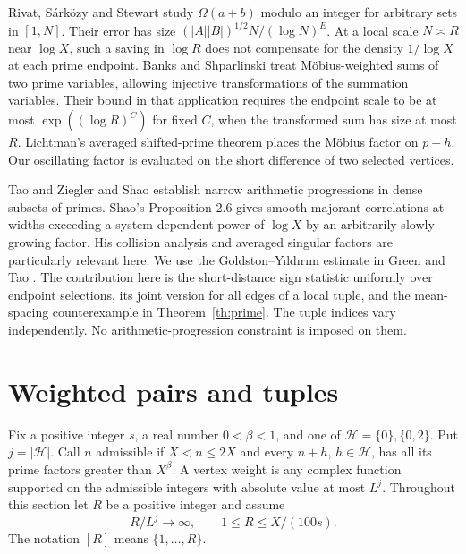 \documentclass[11pt]{article}
\begin{document}
Rivat, S\'ark\"ozy and Stewart \cite[Theorem 1]{rss} study \(\Omega(a+b)\)
modulo an integer for arbitrary sets in \([1,N]\). Their error has size
\((|A||B|)^{1/2}N/(\log N)^E\). At a local scale \(N\asymp R\) near
\(\log X\), such a saving in \(\log R\) does not compensate for the density
\(1/\log X\) at each prime endpoint. Banks and Shparlinski
\cite[\S7.1]{banks} treat M\"obius-weighted sums of two prime variables,
allowing injective transformations of the summation variables. Their bound
in that application requires the endpoint scale to be at most
\(\exp((\log R)^C)\) for fixed \(C\), when the transformed sum has size at
most \(R\). Lichtman's averaged shifted-prime theorem
\cite[Theorem 1.1]{lichtman} places the M\"obius factor on \(p+h\).
Our oscillating factor is evaluated on the short difference of two selected
vertices.

Tao and Ziegler \cite{tz} and Shao \cite{shao} establish narrow arithmetic
progressions in dense subsets of primes. Shao's Proposition 2.6 gives smooth
majorant correlations at widths exceeding a system-dependent power of \(\log X\)
by an arbitrarily slowly growing factor. His collision analysis and averaged
singular factors are particularly relevant here. We use the Goldston--Y{\i}ld{\i}r{\i}m
estimate in Green and Tao \cite[Appendix D, Theorem D.3]{gt}. The contribution
here is the short-distance sign statistic uniformly over endpoint selections,
its joint version for all edges of a local tuple, and the mean-spacing
counterexample in Theorem~\ref{th:prime}. The tuple indices vary independently.
No arithmetic-progression constraint is imposed on them.

\section{Weighted pairs and tuples}
Fix a positive integer \(s\), a real number \(0<\beta<1\), and one of
\(\mathcal H=\{0\},\{0,2\}\). Put \(j=|\mathcal H|\). Call \(n\) admissible
if \(X<n\le2X\) and every \(n+h\), \(h\in\mathcal H\), has all its prime
factors greater than \(X^\beta\). A vertex weight is any complex function
supported on the admissible integers with absolute value at most \(L^j\).
Throughout this section let \(R\) be a positive integer and assume
\begin{equation}\label{eq:width}
       R/L^j\longrightarrow\infty,\qquad 1\le R\le X/(100s).
\end{equation}
The notation \([R]\) means \(\{1,\ldots,R\}\).
\end{document}
